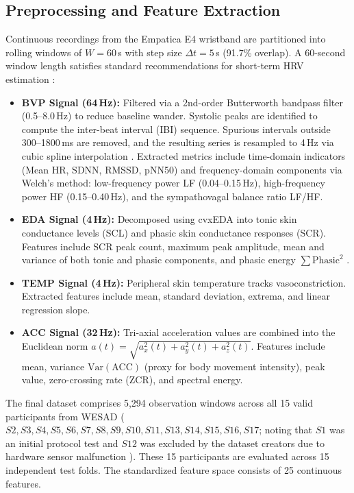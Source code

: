 \documentclass[conference]{IEEEtran}
\begin{document}
\subsection{Preprocessing and Feature Extraction}
Continuous recordings from the Empatica E4 wristband are partitioned into rolling windows of $W = 60$\,s with step size $\Delta t = 5$\,s (91.7\% overlap). A 60-second window length satisfies standard recommendations for short-term HRV estimation \cite{taskforce1996heart}:
\begin{itemize}
    \item \textbf{BVP Signal (64\,Hz):} Filtered via a 2nd-order Butterworth bandpass filter (0.5--8.0\,Hz) to reduce baseline wander. Systolic peaks are identified to compute the inter-beat interval (IBI) sequence. Spurious intervals outside 300--1800\,ms are removed, and the resulting series is resampled to 4\,Hz via cubic spline interpolation \cite{tarvainen2014kubios}. Extracted metrics include time-domain indicators (Mean HR, SDNN, RMSSD, pNN50) and frequency-domain components via Welch's method: low-frequency power LF (0.04--0.15\,Hz), high-frequency power HF (0.15--0.40\,Hz), and the sympathovagal balance ratio LF/HF.
    \item \textbf{EDA Signal (4\,Hz):} Decomposed using cvxEDA \cite{greco2016cvxeda} into tonic skin conductance levels (SCL) and phasic skin conductance responses (SCR). Features include SCR peak count, maximum peak amplitude, mean and variance of both tonic and phasic components, and phasic energy $\sum \text{Phasic}^2$ \cite{boucsein2012electrodermal}.
    \item \textbf{TEMP Signal (4\,Hz):} Peripheral skin temperature tracks vasoconstriction. Extracted features include mean, standard deviation, extrema, and linear regression slope.
    \item \textbf{ACC Signal (32\,Hz):} Tri-axial acceleration values are combined into the Euclidean norm $a(t) = \sqrt{a_x^2(t) + a_y^2(t) + a_z^2(t)}$. Features include mean, variance $\text{Var}(\text{ACC})$ (proxy for body movement intensity), peak value, zero-crossing rate (ZCR), and spectral energy.
\end{itemize}

The final dataset comprises 5,294 observation windows across all 15 valid participants from WESAD ($S2, S3, S4, S5, S6, S7, S8, S9, S10, S11, S13, S14, S15, S16, S17$; noting that $S1$ was an initial protocol test and $S12$ was excluded by the dataset creators due to hardware sensor malfunction \cite{schmidt2018wesad}). These 15 participants are evaluated across 15 independent test folds. The standardized feature space consists of 25 continuous features.
\end{document}

